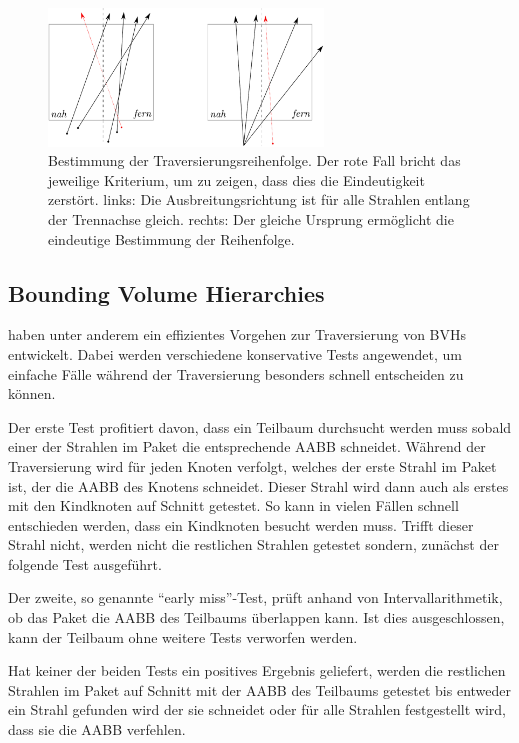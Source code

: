 \begin{figure}\centering
\includegraphics[width=0.65\textwidth]{images/traversalorder.pdf} 
\caption[Bestimmung der Traversierungsreihenfolge für Strahlpakete]{Bestimmung der Traversierungsreihenfolge. Der rote Fall bricht das jeweilige Kriterium, um zu zeigen, dass dies die Eindeutigkeit zerstört. links: Die Ausbreitungsrichtung ist für alle Strahlen entlang der Trennachse gleich. rechts: Der gleiche Ursprung ermöglicht die eindeutige Bestimmung der Reihenfolge.  }
\label{fig:traversalorder}
\end{figure}

\subsection{Bounding Volume Hierarchies}

\cite{WBS07} haben unter anderem ein effizientes Vorgehen zur Traversierung von BVHs entwickelt. Dabei werden verschiedene konservative Tests angewendet, um einfache Fälle während der Traversierung besonders schnell entscheiden zu können.

Der erste Test profitiert davon, dass ein Teilbaum durchsucht werden muss sobald einer der Strahlen im Paket die entsprechende AABB schneidet. Während der Traversierung wird für jeden Knoten verfolgt, welches der erste Strahl im Paket ist, der die AABB des Knotens schneidet. Dieser Strahl wird dann auch als erstes mit den Kindknoten auf Schnitt getestet.
So kann in vielen Fällen schnell entschieden werden, dass ein Kindknoten besucht werden muss. Trifft dieser Strahl nicht, werden nicht die restlichen Strahlen getestet sondern, zunächst der folgende Test ausgeführt.

Der zweite, so genannte ``early miss''-Test, prüft anhand von Intervallarithmetik, ob das Paket die AABB des Teilbaums überlappen kann. Ist dies ausgeschlossen, kann der Teilbaum ohne weitere Tests verworfen werden.

Hat keiner der beiden Tests ein positives Ergebnis geliefert, werden die restlichen Strahlen im Paket auf Schnitt mit der AABB des Teilbaums getestet bis entweder ein Strahl gefunden wird der sie schneidet oder für alle Strahlen festgestellt wird, dass sie die AABB verfehlen.

